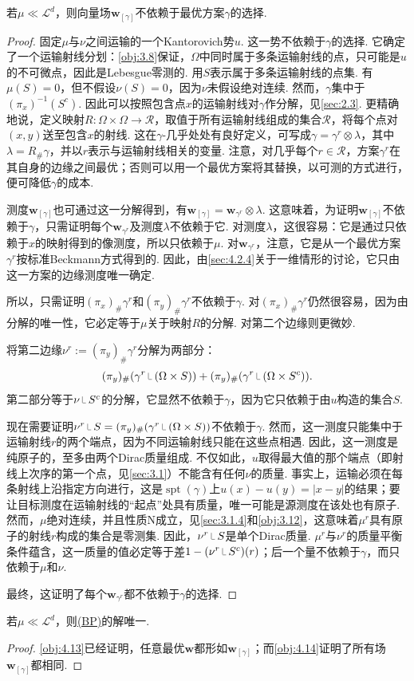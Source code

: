 \begin{theorem}\label{obj:4.14}
若$\mu\ll\mathscr L^d$，则向量场$\mathbf w_{[\gamma]}$不依赖于最优方案$\gamma$的选择.
\end{theorem}
\begin{proof}
固定$\mu$与$\nu$之间运输的一个Kantorovich势$u$. 这一势不依赖于$\gamma$的选择. 它确定了一个运输射线分划：\autoref{obj:3.8}保证，$\Omega$中同时属于多条运输射线的点，只可能是$u$的不可微点，因此是Lebesgue零测的. 用$S$表示属于多条运输射线的点集. 有$\mu(S)=0$，但不假设$\nu(S)=0$，因为$\nu$未假设绝对连续. 然而，$\gamma$集中于$(\pi_x)^{-1}(S^c)$. 因此可以按照包含点$x$的运输射线对$\gamma$作分解，见\autoref{sec:2.3}. 更精确地说，定义映射$R:\Omega\times\Omega\to\mathscr R$，取值于所有运输射线组成的集合$\mathscr R$，将每个点对$(x,y)$送至包含$x$的射线. 这在$\gamma$-几乎处处有良好定义，可写成$\gamma=\gamma^r\otimes\lambda$，其中$\lambda=R_\#\gamma$，并以$r$表示与运输射线相关的变量. 注意，对几乎每个$r\in\mathscr R$，方案$\gamma^r$在其自身的边缘之间最优；否则可以用一个最优方案将其替换，以可测的方式进行，便可降低$\gamma$的成本.

测度$\mathbf w_{[\gamma]}$也可通过这一分解得到，有$\mathbf w_{[\gamma]}=\mathbf w_{\gamma^r}\otimes\lambda$. 这意味着，为证明$\mathbf w_{[\gamma]}$不依赖于$\gamma$，只需证明每个$\mathbf w_{\gamma^r}$及测度$\lambda$不依赖于它. 对测度$\lambda$，这很容易：它是通过只依赖于$x$的映射得到的像测度，所以只依赖于$\mu$. 对$\mathbf w_{\gamma^r}$，注意，它是从一个最优方案$\gamma^r$按标准Beckmann方式得到的. 因此，由\autoref{sec:4.2.4}关于一维情形的讨论，它只由这一方案的边缘测度唯一确定.

所以，只需证明$(\pi_x)_\#\gamma^r$和$(\pi_y)_\#\gamma^r$不依赖于$\gamma$. 对$(\pi_x)_\#\gamma^r$仍然很容易，因为由分解的唯一性，它必定等于$\mu$关于映射$R$的分解. 对第二个边缘则更微妙.

将第二边缘$\nu^r:=(\pi_y)_\#\gamma^r$分解为两部分：
\[
 (\pi_y)_\#(\gamma^r\restr(\Omega\times S))
 +(\pi_y)_\#(\gamma^r\restr(\Omega\times S^c)).
\]
第二部分等于$\nu\restr S^c$的分解，它显然不依赖于$\gamma$，因为它只依赖于由$u$构造的集合$S$.

现在需要证明$\nu^r\restr S=(\pi_y)_\#(\gamma^r\restr(\Omega\times S))$不依赖于$\gamma$. 然而，这一测度只能集中于运输射线$r$的两个端点，因为不同运输射线只能在这些点相遇. 因此，这一测度是纯原子的，至多由两个Dirac质量组成. 不仅如此，$u$取得最大值的那个端点（即射线上次序的第一个点，见\autoref{sec:3.1}）不能含有任何$\nu$的质量. 事实上，运输必须在每条射线上沿指定方向进行，这是$\operatorname{spt}(\gamma)$上$u(x)-u(y)=|x-y|$的结果；要让目标测度在运输射线的“起点”处具有质量，唯一可能是源测度在该处也有原子. 然而，$\mu$绝对连续，并且性质N成立，见\autoref{sec:3.1.4}和\autoref{obj:3.12}，这意味着$\mu^r$具有原子的射线$r$构成的集合是零测集. 因此，$\nu^r\restr S$是单个Dirac质量. $\mu^r$与$\nu^r$的质量平衡条件蕴含，这一质量的值必定等于差$1-(\nu^r\restr S^c)(r)$；后一个量不依赖于$\gamma$，而只依赖于$\mu$和$\nu$.

最终，这证明了每个$\mathbf w_{\gamma^r}$都不依赖于$\gamma$的选择.
\end{proof}

\begin{corollary}\label{obj:4.15}
若$\mu\ll\mathscr L^d$，则\hyperref[obj:4.5]{(BP)}的解唯一.
\end{corollary}
\begin{proof}
\autoref{obj:4.13}已经证明，任意最优$\mathbf w$都形如$\mathbf w_{[\gamma]}$；而\autoref{obj:4.14}证明了所有场$\mathbf w_{[\gamma]}$都相同.
\end{proof}
